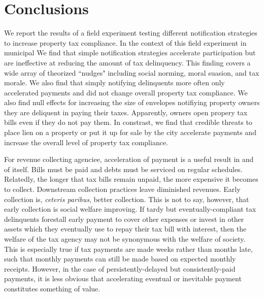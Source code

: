 \documentclass[12pt,titlepage]{article}
\begin{document}
\section{Conclusions}

We report the results of a field experiment testing different notification strategies 
to increase property tax compliance. In the context of this field experiment in municipal 
We find that simple notification strategies accelerate participation but are 
ineffective at reducing the amount of tax delinquency. This finding covers a 
wide array of theorized  ``nudges" including social norming, moral suasion, 
and tax morale. We also find that simply notifying delinquents more often only accelerated
payments and did not change overall property tax compliance. We also find null effects for
increasing the size of envelopes notifiying property owners they are deliquent in paying 
their taxes. Apparently, owners open propery tax bills even if they do not pay them.
In constrast, we find that credible threats to place lien on a property or put it up for 
sale by the city accelerate payments and increase the overall level of property tax compliance.  

For revenue collecting agenciee, acceleration of payment is a useful result 
in and of itself. Bills must be paid and debts must be serviced on regular 
schedules. Relatedly, the longer that tax bills remain unpaid, the more 
expensive it becomes to collect. Downstream collection practices leave 
diminished revenues. Early collection is, 
\textit{ceteris paribus}, better collection. This is not to say, 
however, that early collection is social welfare improving. If tardy 
but eventually-compliant tax delinquents forestall early payment to 
cover other expenses or invest in other assets which they eventually 
use to repay their tax bill with interest, then the welfare of the tax 
agency may not be synonymous with the welfare of society. This is 
especially true if tax payments are made weeks rather than months late, 
such that monthly payments can still be made based on expected monthly 
receipts. However, in the case of persistently-delayed but consistently-paid 
payments, it is less obvious that accelerating eventual or inevitable 
payment constitutes something of value. 
\end{document}
